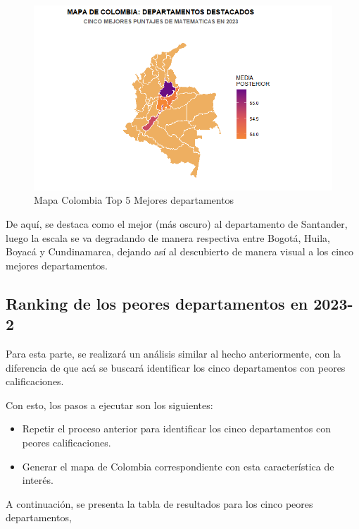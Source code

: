 \documentclass[12pt]{article}
\begin{document}
\newpage

\begin{figure}[H]
    \centering
    \includegraphics[width=1\linewidth]{Imagenes/MapaColombia2.png}
    \caption{Mapa Colombia Top 5 Mejores departamentos}
    \label{fig_enter_label}
\end{figure}

De aquí, se destaca como el mejor (más oscuro) al departamento de Santander, luego la escala se va degradando de manera respectiva entre Bogotá, Huila, Boyacá y Cundinamarca, dejando así al descubierto de manera visual a los cinco mejores departamentos.


\subsection{Ranking de los peores departamentos en 2023-2}

Para esta parte, se realizará un análisis similar al hecho anteriormente, con la diferencia de que acá se buscará identificar los cinco departamentos con peores calificaciones.

Con esto, los pasos a ejecutar son los siguientes:

\begin{itemize}
    \item  Repetir el proceso anterior para identificar los cinco departamentos con peores calificaciones.
    \item Generar el mapa de Colombia correspondiente con esta característica de interés.
\end{itemize}

A continuación, se presenta la tabla de resultados para los cinco peores departamentos, 
\end{document}
